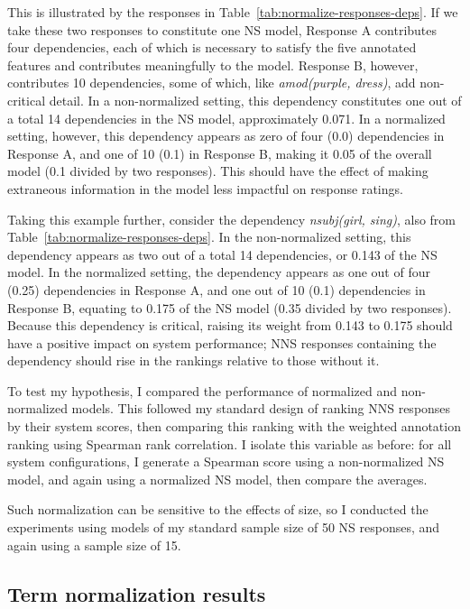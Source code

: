 This is illustrated by the responses in Table~\ref{tab:normalize-responses-deps}. If we take these two responses to constitute one NS model, Response A contributes four dependencies, each of which is necessary to satisfy the five annotated features and contributes meaningfully to the model. Response B, however, contributes 10 dependencies, some of which, like \textit{amod(purple, dress)}, add non-critical detail. In a non-normalized setting, this dependency constitutes one out of a total 14 dependencies in the NS model, approximately 0.071. In a normalized setting, however, this dependency appears as zero of four (0.0) dependencies in Response A, and one of 10 (0.1) in Response B, making it 0.05 of the overall model (0.1 divided by two responses). This should have the effect of making extraneous information in the model less impactful on response ratings.

Taking this example further, consider the dependency \textit{nsubj(girl, sing)}, also from Table~\ref{tab:normalize-responses-deps}. In the non-normalized setting, this dependency appears as two out of a total 14 dependencies, or 0.143 of the NS model. In the normalized setting, the dependency appears as one out of four (0.25) dependencies in Response A, and one out of 10 (0.1) dependencies in Response B, equating to 0.175 of the NS model (0.35 divided by two responses). Because this dependency is critical, raising its weight from 0.143 to 0.175 should have a positive impact on system performance; NNS responses containing the dependency should rise in the rankings relative to those without it. 

To test my hypothesis, I compared the performance of normalized and non-normalized models. This followed my standard design of ranking NNS responses by their system scores, then comparing this ranking with the weighted annotation ranking using Spearman rank correlation. I isolate this variable as before: for all system configurations, I generate a Spearman score using a non-normalized NS model, and again using a normalized NS model, then compare the averages.

Such normalization can be sensitive to the effects of size, so I conducted the  experiments using models of my standard sample size of 50 NS responses, and again using a sample size of 15.

\subsection{Term normalization results}
\label{sec:term-norm-results}

